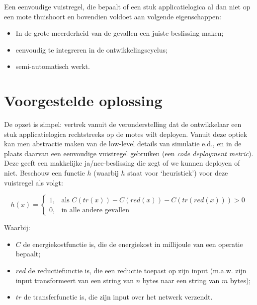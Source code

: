 \documentclass[11pt]{article}
\begin{document}
Een eenvoudige vuistregel, die bepaalt of een stuk applicatielogica al dan niet op een mote thuishoort en bovendien voldoet aan volgende eigenschappen:
\begin{itemize}
\item In de grote meerderheid van de gevallen een juiste beslissing maken;
\item eenvoudig te integreren in de ontwikkelingscyclus;
\item semi-automatisch werkt.
\end{itemize}

\section{Voorgestelde oplossing}
De opzet is simpel: vertrek vanuit de veronderstelling dat de ontwikkelaar een
stuk applicatielogica rechtstreeks op de motes wilt deployen. Vanuit deze optiek
kan men abstractie maken van de low-level details van simulatie e.d., en in de plaats daarvan een eenvoudige vuistregel gebruiken (een \textit{code
deployment metric}). Deze geeft een makkelijke ja/nee-beslissing die zegt of we
kunnen deployen of niet. Beschouw een functie $h$ (waarbij $h$ staat voor
`heuristiek') voor deze vuistregel als volgt:


\[
h(x)= 
\begin{cases}
  1, & \text{als } C(tr(x)) - C(red(x)) - C(tr(red(x))) > 0  \\
  0, & \text{in alle andere gevallen}
\end{cases}
\]

Waarbij:

\begin{itemize}
\item $C$ de energiekostfunctie is, die de energiekost in millijoule van een
operatie bepaalt;
\item $red$ de reductiefunctie is, die een reductie toepast op zijn input
(m.a.w. zijn input transformeert van een string van $n$ bytes naar een string
van $m$ bytes);
\item $tr$ de transferfunctie is, die zijn input over het netwerk verzendt.
\end{itemize}
\end{document}
